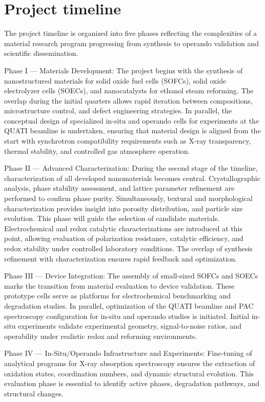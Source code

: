 \section{Project timeline}

The project timeline is organized into five phases reflecting the complexities of a material research program progressing from synthesis to operando validation and scientific dissemination. 

Phase I — Materials Development: The project begins with the synthesis of nanostructured materials for solid oxide fuel cells (SOFCs), solid oxide electrolyzer cells (SOECs), and nanocatalysts for ethanol steam reforming. The overlap during the initial quarters allows rapid iteration between compositions, microstructure control, and defect engineering strategies. In parallel, the conceptual design of specialized in-situ and operando cells for experiments at the QUATI beamline is undertaken, ensuring that material design is aligned from the start with synchrotron compatibility requirements such as X-ray transparency, thermal stability, and controlled gas atmosphere operation.

Phase II — Advanced Characterization: During the second stage of the timeline, characterization of all developed nanomaterials becomes central. Crystallographic analysis, phase stability assessment, and lattice parameter refinement are performed to confirm phase purity. Simultaneously, textural and morphological characterization provides insight into porosity distribution, and particle size evolution. This phase will guide the selection of candidate materials. Electrochemical and redox catalytic characterizations are introduced at this point, allowing evaluation of polarization resistance, catalytic efficiency, and redox stability under controlled laboratory conditions. The overlap of synthesis refinement with characterization ensures rapid feedback and optimization.

Phase III — Device Integration: The assembly of small-sized SOFCs and SOECs marks the transition from material evaluation to device validation. These prototype cells serve as platforms for electrochemical benchmarking and degradation studies. In parallel, optimization of the QUATI beamline and PAC spectroscopy configuration for in-situ and operando studies is initiated. Initial in-situ experiments validate experimental geometry, signal-to-noise ratios, and operability under realistic redox and reforming environments.

Phase IV — In-Situ/Operando Infrastructure and Experiments: Fine-tuning of analytical programs for X-ray absorption spectroscopy ensures the extraction of oxidation states, coordination numbers, and dynamic structural evolution. This evaluation phase is essential to identify active phases, degradation pathways, and structural changes.


